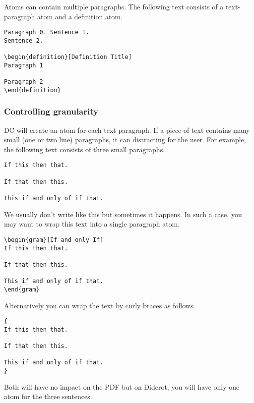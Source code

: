 \begin{note}
Atoms can contain multiple paragraphs.  The following text consists of a text-paragraph atom and a definition atom.


\begin{lstlisting}
Paragraph 0. Sentence 1.
Sentence 2.

\begin{definition}[Definition Title]
Paragraph 1

Paragraph 2
\end{definition}
\end{lstlisting}
\end{note}

\begin{important}
\end{important}

\subsubsection{Controlling granularity}

DC will create an atom for each text paragraph.  If a piece of text contains many small (one or two line) paragraphs, it can distracting for the user.  For example, the following text consists of three small paragraphs.
%
\begin{lstlisting}
If this then that.

If that then this.

This if and only of if that.
\end{lstlisting}

We usually don't write like this but sometimes it happens.
%
In such a case, you may want to wrap this text into a single paragraph atom.
%
\begin{lstlisting}
\begin{gram}[If and only If]
If this then that.

If that then this.

This if and only of if that.
\end{gram}
\end{lstlisting}
%
Alternatively you can wrap the text by curly braces as follows.
%
\begin{lstlisting}
{
If this then that.

If that then this.

This if and only of if that.
}
\end{lstlisting}
%
%
Both will have no impact on the PDF but on Diderot, you will have only one atom for the three sentences.


